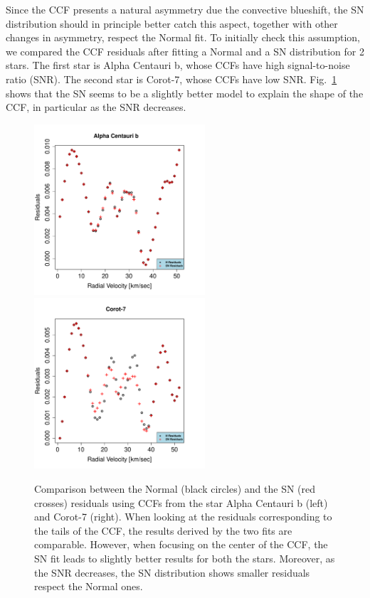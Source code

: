 \documentclass[11pt, oneside]{article}
\begin{document}
{Since the CCF presents a natural asymmetry due the convective blueshift, the SN distribution should in principle better catch this aspect, together with other changes in asymmetry, respect the Normal fit. To initially check this assumption, we compared the CCF residuals after fitting a Normal and a SN distribution for 2 stars. The first star is Alpha Centauri b, whose CCFs have high signal-to-noise ratio (SNR). The second star is Corot-7, whose CCFs have low SNR. Fig.~\ref{fig:Residual.comparison} shows that the SN seems to be a slightly better model to explain the shape of the CCF, in particular as the SNR decreases.
%
\begin{figure}[htbp]
   \centering
\includegraphics[height = 2.5in]{[1]HD128621Residuals.pdf} 
\includegraphics[height = 2.5in]{[1]LRa01_E2Residuals.pdf} 
   \caption{Comparison between the Normal (black circles) and the SN (red crosses) residuals using CCFs from the star Alpha Centauri b (left) and Corot-7 (right). When looking at the residuals corresponding to the tails of the CCF, the results derived by the two fits are comparable. However, when focusing on the center of the CCF, the SN fit leads to slightly better results for both the stars. Moreover, as the SNR decreases, the SN distribution shows smaller residuals respect the Normal ones.}
    \label{fig:Residual.comparison}
\end{figure}
%

}
\end{document}
